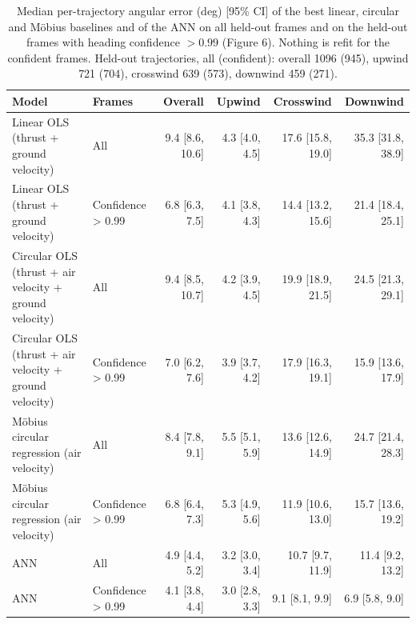 \begin{table}[h!]
    \centering
    \caption{Median per-trajectory angular error (deg) [95\% CI] of the best linear, circular and M\"obius baselines and of the ANN on all held-out frames and on the held-out frames with heading confidence $> 0.99$ (Figure 6). Nothing is refit for the confident frames. Held-out trajectories, all (confident): overall 1096 (945), upwind 721 (704), crosswind 639 (573), downwind 459 (271).}
    \label{tab:confident_frames}
    \begin{tabular}{@{}llrrrr@{}}
        \toprule
        Model & Frames & Overall & Upwind & Crosswind & Downwind \\
        \midrule
        Linear OLS (thrust + ground velocity) & All & 9.4 [8.6, 10.6] & 4.3 [4.0, 4.5] & 17.6 [15.8, 19.0] & 35.3 [31.8, 38.9] \\
        Linear OLS (thrust + ground velocity) & Confidence > 0.99 & 6.8 [6.3, 7.5] & 4.1 [3.8, 4.3] & 14.4 [13.2, 15.6] & 21.4 [18.4, 25.1] \\
        Circular OLS (thrust + air velocity + ground velocity) & All & 9.4 [8.5, 10.7] & 4.2 [3.9, 4.5] & 19.9 [18.9, 21.5] & 24.5 [21.3, 29.1] \\
        Circular OLS (thrust + air velocity + ground velocity) & Confidence > 0.99 & 7.0 [6.2, 7.6] & 3.9 [3.7, 4.2] & 17.9 [16.3, 19.1] & 15.9 [13.6, 17.9] \\
        Möbius circular regression (air velocity) & All & 8.4 [7.8, 9.1] & 5.5 [5.1, 5.9] & 13.6 [12.6, 14.9] & 24.7 [21.4, 28.3] \\
        Möbius circular regression (air velocity) & Confidence > 0.99 & 6.8 [6.4, 7.3] & 5.3 [4.9, 5.6] & 11.9 [10.6, 13.0] & 15.7 [13.6, 19.2] \\
        ANN & All & 4.9 [4.4, 5.2] & 3.2 [3.0, 3.4] & 10.7 [9.7, 11.9] & 11.4 [9.2, 13.2] \\
        ANN & Confidence > 0.99 & 4.1 [3.8, 4.4] & 3.0 [2.8, 3.3] & 9.1 [8.1, 9.9] & 6.9 [5.8, 9.0] \\
        \bottomrule
    \end{tabular}
\end{table}
